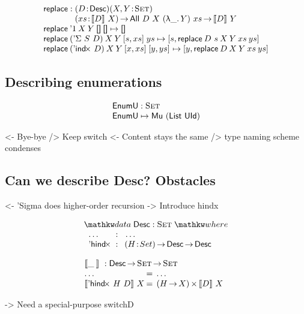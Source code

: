 \documentclass[preprint, authoryear, onecolumn]{sigplanconf}
\newenvironment{structure}{\footnotesize\verbatim}{\endverbatim}
\begin{document}
\[\stk{
\F{replace} : 
\stk{\PITEL{D}{\Desc}\PITEL{X,Y}{\Set}\\
           \PI{xs}{\descop{D}{X}} \All{D}{X}{(\LAM{\_}Y)}{xs} \To
           \descop{D}{Y}}
\\
\F{replace}\:\DUnit\: X\:Y\:\Void\:\Void\mapsto\Void \\
\F{replace}\:(\DSigma{S}{D})\:X\:Y\:\pair{s}{xs}{}\:ys\mapsto
 \pair{s}{\F{replace}\:{D~s}\:X\:Y\:xs\:ys}{}         \\
\F{replace}\:(\DIndx{D})\:X\:Y\:\pair{x}{xs}{}\:\pair{y}{ys}{} \mapsto
    \pair{y}{\F{replace}\:D\:X\:Y\:xs\:ys}{}
}\]

\subsection{Describing enumerations}

\[\stk{
\EnumU : \Set \\
\EnumU \mapsto \Mu{(\List~\UId)}
}\]


\begin{structure}
<- Bye-bye \spi
    /> Keep switch
<- Content stays the same
    /> type naming scheme condenses
\end{structure}


\subsection{Can we describe Desc? Obstacles}

\begin{structure}
<- 'Sigma does higher-order recursion
    -> Introduce hindx
\end{structure}

\[
\stk{
\data \Desc : \Set \where \\
\;\;\begin{array}{@{}l@{\::\:\:}l@{\quad}l}
    \ldots          & \:\:\ldots \\
    \DHindx         & \PI{H}{Set} \Desc \To \Desc
\end{array}
}
\]

\[\stk{
\descop{\_\:}{} : \Desc \To \Set \To \Set \\
\begin{array}{@{}l@{\:=\:\:}ll}
\ldots                        &  \ldots \\
\descop{\DHindx{H}{D}}{X}     &  \TIMES{(H \To X)}{\descop{D}{X}}
\end{array}
}\]

\begin{structure}
    -> Need a special-purpose switchD
\end{structure}
\end{document}

